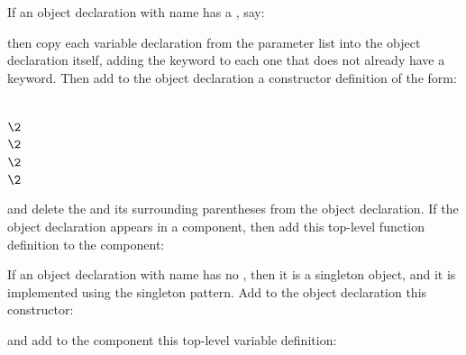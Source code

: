 If an object declaration with name  has a , say:
\begin{codeexamplesize}
\begin{tabbing}
\end{tabbing}
\end{codeexamplesize}
then copy each variable declaration  from the parameter list into the
object declaration itself, adding the  keyword
to each one that does not already have a  keyword.
Then add to the object declaration a constructor definition of the form:
\begin{codeexamplesize}
\begin{tabbing}
 \\
\(\2\) \\
\(\2\) \\
\(\2\)\EXP{\ldots} \\
\(\2\) \\
\end{tabbing}
\end{codeexamplesize}
and delete the  and its surrounding parentheses
from the object declaration.  If the object declaration appears in a component,
then add this top-level function definition to the component:
\begin{codeexamplesize}
\begin{tabbing}
\end{tabbing}
\end{codeexamplesize}

If an object declaration with name  has no ,
then it is a singleton object, and it is implemented using the
singleton pattern.
Add to the object declaration this constructor:
\begin{codeexamplesize}
\begin{tabbing}
\end{tabbing}
\end{codeexamplesize}
and add to the component this top-level variable definition:
\begin{tabbing}
\end{tabbing}

